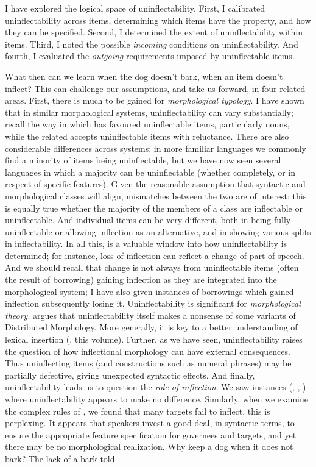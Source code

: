 \documentclass[output=paper,colorlinks,citecolor=brown]{langscibook}
\begin{document}
I have explored the logical space of uninflectability. First, I calibrated uninflectability across items, determining which items have the property, and how they can be specified. Second, I determined the extent of uninflectability within items. Third, I noted the possible \textit{incoming} conditions on uninflectability. And fourth, I evaluated the \textit{outgoing} requirements imposed by uninflectable items.

What then can we learn when the dog doesn't bark, when an item doesn't inflect? This can challenge our assumptions, and take us forward, in four related areas. First, there is much to be gained for \emph{morphological typology}. I have shown that in similar morphological systems, uninflectability can vary substantially; recall the way in which  has favoured uninflectable items, particularly nouns, while the related  accepts uninflectable items with reluctance. There are also considerable differences across systems: in more familiar languages we commonly find a minority of items being uninflectable, but we have now seen several languages in which a majority can be uninflectable (whether completely, or in respect of specific features). Given the reasonable assumption that syntactic and morphological classes will align, mismatches between the two are of interest; this is equally true whether the majority of the members of a class are inflectable or uninflectable. And individual items can be very different, both in being fully uninflectable or allowing inflection as an alternative, and in showing various splits in inflectability. In all this, \emph{} is a valuable window into how uninflectability is determined; for instance, loss of inflection can reflect a change of part of speech. And we should recall that change is not always from uninflectable items (often the result of borrowing) gaining inflection as they are integrated into the morphological system; I have also given instances of borrowings which gained inflection subsequently losing it. Uninflectability is significant for \emph{morphological theory}. \citet[143]{spencer2020} argues that uninflectability itself makes a nonsense of some variants of Distributed Morphology. More generally, it is key to a better understanding of lexical insertion (\citeauthor{spencer2025}, this volume). Further, as we have seen, uninflectability raises the question of how inflectional morphology can have external consequences. Thus uninflecting items (and constructions such as  numeral phrases) may be partially defective, giving unexpected syntactic effects. And finally, uninflectability leads us to question the \emph{role of inflection}. We saw instances (, , ) where uninflectability appears to make no difference. Similarly, when we examine the complex  rules of , we found that many  targets fail to inflect, this is perplexing. It appears that speakers invest a good deal, in syntactic terms, to ensure the appropriate feature specification for governees and  targets, and yet there may be no morphological realization. Why keep a dog when it does not bark? The lack of a bark told 
\end{document}
